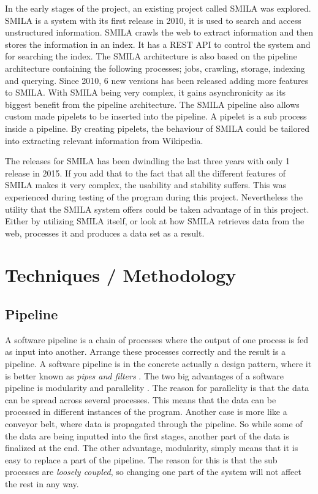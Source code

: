 In the early stages of the project, an existing project called SMILA \cite{smila} was explored. SMILA is a system with its first release in 2010, it is used to search and access unstructured information. SMILA crawls the web to extract information and then stores the information in an index. It has a REST API to control the system and for searching the index. The SMILA architecture is also based on the pipeline architecture containing the following processes; jobs, crawling, storage, indexing and querying. Since 2010, 6 new versions has been released adding more features to SMILA. With SMILA being very complex, it gains asynchronicity as its biggest benefit from the pipeline architecture. The SMILA pipeline also allows custom made pipelets to be inserted into the pipeline. A pipelet is a sub process inside a pipeline. By creating pipelets, the behaviour of SMILA could be tailored into extracting relevant information from Wikipedia.

The releases for SMILA has been dwindling the last three years with only 1 release in 2015. If you add that to the fact that all the different features of SMILA makes it very complex, the usability and stability suffers. This was experienced during testing of the program during this project.
Nevertheless the utility that the SMILA system offers could be taken advantage of in this project. Either by utilizing SMILA itself, or look at how SMILA retrieves data from the web, processes it and produces a data set as a result.


\section{Techniques / Methodology}

\subsection{Pipeline} \label{pipeline}

A software pipeline is a chain of processes where the output of one process is fed as input into another. Arrange these processes correctly and the result is a pipeline. A software pipeline is in the concrete actually a design pattern, where it is better known as \textit{pipes and filters} \cite{pipes-and-filters}. The two big advantages of a software pipeline is modularity and parallelity \cite{dart}. The reason for parallelity is that the data can be spread across several processes. This means that the data can be processed in different instances of the program. Another case is more like a conveyor belt, where data is propagated through the pipeline. So while some of the data are being inputted into the first stages, another part of the data is finalized at the end. The other advantage, modularity, simply means that it is easy to replace a part of the pipeline. The reason for this is that the sub processes are \textit{loosely coupled}, so changing one part of the system will not affect the rest in any way.

